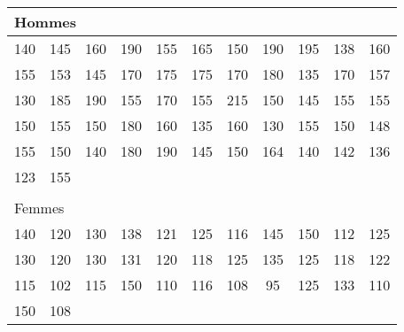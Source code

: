 \documentclass{standalone}
\begin{document}
  
{\tiny 
	\begin{tabular}{ccccccccccc}
	\hline
	\multicolumn{11}{l}{Hommes}\\
	\hline
		140 & 145 & 160 & 190 & 155 & 165 & 150 & 190 & 195 & 138 & 160 \\
		155 & 153 & 145 & 170 & 175 & 175 & 170 & 180 & 135 & 170 & 157 \\
		130 & 185 & 190 & 155 & 170 & 155 & 215 & 150 & 145 & 155 & 155 \\
		150 & 155 & 150 & 180 & 160 & 135 & 160 & 130 & 155 & 150 & 148 \\
		155 & 150 & 140 & 180 & 190 & 145 & 150 & 164 & 140 & 142 & 136 \\
		123 & 155 &&&&&&&&&\\
		&&&&&&&&&&\\
		\multicolumn{11}{l}{Femmes}\\
		\hline
		140 & 120 & 130 & 138 & 121 & 125 & 116 & 145 & 150 & 112 & 125 \\
		130 & 120 & 130 & 131 & 120 & 118 & 125 & 135 & 125 & 118 & 122 \\
		115 & 102 & 115 & 150 & 110 & 116 & 108 & 95  & 125 & 133 & 110 \\
		150 & 108 &&&&&&&&&\\
	\hline
	\end{tabular}
	}
\end{document}
